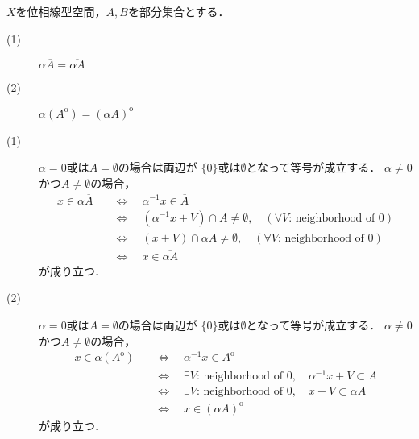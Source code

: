 	\begin{screen}
		\begin{thm}
			$X$を位相線型空間，$A,B$を部分集合とする．
			\begin{description}
				\item[(1)] $\alpha \overline{A} = \overline{\alpha A}$
				\item[(2)] $\alpha (A^{\mathrm{o}}) = (\alpha A)^{\mathrm{o}}$
			\end{description}
		\end{thm}
	\end{screen}
	
	\begin{prf}\mbox{}
		\begin{description}
			\item[(1)] $\alpha = 0$或は$A = \emptyset$の場合は両辺が
				$\{0\}$或は$\emptyset$となって等号が成立する．
				$\alpha \neq 0$かつ$A \neq \emptyset$の場合，
				\begin{align}
					x \in \alpha \overline{A}
					\quad &\Longleftrightarrow \quad
					\alpha^{-1}x \in \overline{A} \\
					\quad &\Longleftrightarrow \quad
					\left(\alpha^{-1}x + V\right) \cap A \neq \emptyset, \quad 
						(\mbox{$\forall V$: neighborhood of 0}) \\
					\quad &\Longleftrightarrow \quad
					\left(x + V\right) \cap \alpha A \neq \emptyset, \quad 
						(\mbox{$\forall V$: neighborhood of 0}) \\
					\quad &\Longleftrightarrow \quad
					x \in \overline{\alpha A}
				\end{align}
				が成り立つ．
				
			\item[(2)] $\alpha = 0$或は$A = \emptyset$の場合は両辺が
				$\{0\}$或は$\emptyset$となって等号が成立する．
				$\alpha \neq 0$かつ$A \neq \emptyset$の場合，
				\begin{align}
					x \in \alpha (A^{\mathrm{o}})
					\quad &\Longleftrightarrow \quad
					\alpha^{-1}x \in A^{\mathrm{o}} \\
					\quad &\Longleftrightarrow \quad
					\mbox{$\exists V$: neighborhood of 0},\quad \alpha^{-1}x + V \subset A \\
					\quad &\Longleftrightarrow \quad
					\mbox{$\exists V$: neighborhood of 0},\quad x + V \subset \alpha A \\
					\quad &\Longleftrightarrow \quad
					x \in (\alpha A)^{\mathrm{o}}
				\end{align}
				が成り立つ．
				
		\end{description}
	\end{prf}
	
